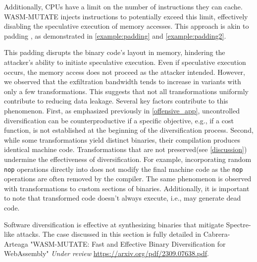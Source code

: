 

 Additionally, CPUs have a limit on the number of instructions they can cache. 
WASM-MUTATE injects instructions to potentially exceed this limit, effectively disabling the speculative execution of memory accesses. 
This approach is akin to padding \cite{padding}, as demonstrated in \autoref{example:padding} and \autoref{example:padding2}.


This padding disrupts the binary code's layout in memory, hindering the attacker's ability to initiate speculative execution. 
Even if speculative execution occurs, the memory access does not proceed as the attacker intended.
However, we observed that the exfiltration bandwidth tends to increase in variants with only a few transformations. 
This suggests that not all transformations uniformly contribute to reducing data leakage. 
Several key factors contribute to this phenomenon.
First, as emphasized previously in \autoref{offensive_app}, uncontrolled diversification can be counterproductive if a specific objective, e.g., if a cost function, is not established at the beginning of the diversification process.
Second, while some transformations yield distinct \wasm binaries, their compilation produces identical machine code.
Transformations that are not preserved(see \autoref{discussion}) undermine the effectiveness of diversification.
For example, incorporating random \texttt{nop} operations directly into \wasm does not modify the final machine code as the \texttt{nop} operations are often removed by the compiler.
The same phenomenon is observed with transformations to custom sections of \Wasm binaries.
Additionally, it is important to note that transformed code doesn't always execute, i.e., \tool may generate dead code.






\begin{tcolorbox}[title=Contribution paper,boxrule=1pt,arc=.2em,boxsep=1.0mm]
    Software diversification is effective at synthesizing \wasm binaries that mitigate Spectre-like attacks. 
    The case discussed in this section is fully detailed in Cabrera-Arteaga \etal "WASM-MUTATE: Fast and Effective Binary Diversification for WebAssembly"
    \emph{Under review}
    \url{https://arxiv.org/pdf/2309.07638.pdf}. 
\end{tcolorbox}



